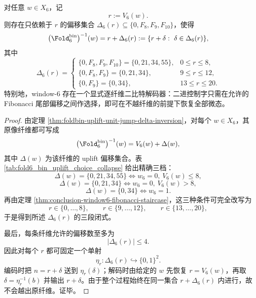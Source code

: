 \begin{theorem}\label{thm:conclusion-window6-fibonacci-tail-two-bit-decoder}
对任意 \(w\in X_6\)，记
\[
r:=V_6(w).
\]
则存在只依赖于 \(r\) 的偏移集合 \(\Delta_6(r)\subseteq\{0,F_8,F_9,F_{10}\}\)，使得
\[
\bigl(\Fold_6^{\mathrm{bin}}\bigr)^{-1}(w)
=
r+\Delta_6(r)
:=
\{r+\delta:\ \delta\in\Delta_6(r)\},
\]
其中
\[
\Delta_6(r)=
\begin{cases}
\{0,F_8,F_9,F_{10}\}=\{0,21,34,55\},& 0\le r\le 8,\\[2mm]
\{0,F_8,F_9\}=\{0,21,34\},& 9\le r\le 12,\\[2mm]
\{0,F_9\}=\{0,34\},& 13\le r\le 20.
\end{cases}
\]
特别地，window-\(6\) 存在一个显式逐纤维二比特解码器：二进控制字只需在允许的 Fibonacci 尾部偏移之间作选择，即可在不越纤维的前提下恢复全部微态。
\end{theorem}
\begin{proof}
由定理 \ref{thm:foldbin-uplift-unit-jump-delta-inversion}，对每个 \(w\in X_6\)，其原像纤维都可写成
\[
\bigl(\Fold_6^{\mathrm{bin}}\bigr)^{-1}(w)=V_6(w)+\Delta(w),
\]
其中 \(\Delta(w)\) 为该纤维的 uplift 偏移集合。表 \ref{tab:fold6_bin_uplift_choice_collapse} 给出精确三档：
\[
\Delta(w)=\{0,21,34,55\}
\iff
w_6=0,\ V_6(w)\le 8,
\]
\[
\Delta(w)=\{0,21,34\}
\iff
w_6=0,\ V_6(w)>8,
\]
\[
\Delta(w)=\{0,34\}
\iff
w_6=1.
\]
再由定理 \ref{thm:conclusion-window6-fibonacci-staircase}，这三种条件可完全改写为
\[
r\in\{0,\dots,8\},\qquad
r\in\{9,\dots,12\},\qquad
r\in\{13,\dots,20\},
\]
于是得到所述 \(\Delta_6(r)\) 的三段闭式。

最后，每条纤维允许的偏移数至多为
\[
|\Delta_6(r)|\le 4.
\]
因此对每个 \(r\) 都可固定一个单射
\[
\eta_r:\Delta_6(r)\hookrightarrow \{0,1\}^2.
\]
编码时把 \(n=r+\delta\) 送到 \(\eta_r(\delta)\)；解码时由给定的 \(w\) 先恢复 \(r=V_6(w)\)，再取 \(\delta=\eta_r^{-1}(b)\) 并输出 \(r+\delta\)。由于整个过程始终在同一集合 \(r+\Delta_6(r)\) 内进行，故不会越出原纤维。证毕。
\end{proof}

